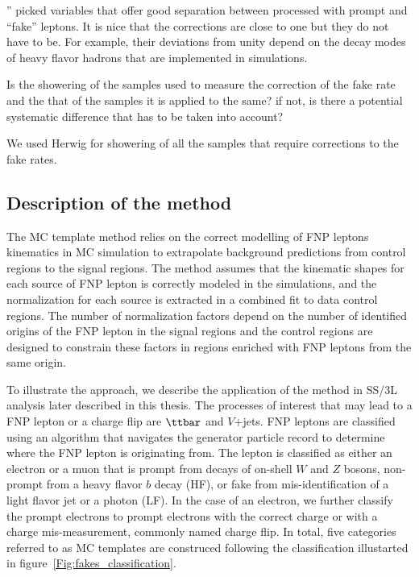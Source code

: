 ''
picked variables that offer good separation between processed with prompt and ``fake'' leptons.
It is nice that the corrections are close to one but they do not have to be. For example, their deviations from unity depend on the decay modes of heavy flavor hadrons that are implemented in simulations.

Is the showering of the samples used to measure the correction of the fake rate and the that of the samples it is applied to the same? if not, is there a potential systematic difference that has to be taken into account?

We used Herwig for showering of all the samples that require corrections to the fake rates.


\subsection{Description of the method}

The MC template method relies on the correct modelling of FNP leptons kinematics in 
MC simulation to extrapolate background predictions from control regions to the signal regions.
The method assumes that the kinematic shapes for each source of FNP lepton is correctly modeled in the simulations, 
and the normalization for each source is extracted in a combined fit to data control regions.
The number of normalization factors depend on the number of identified origins of the FNP lepton in the signal regions
and the control regions are designed to constrain these factors in regions enriched with FNP leptons from the same origin.

To illustrate the approach, we describe the application of the method in SS/3L analysis later described in this thesis.
The processes of interest that may lead to a FNP lepton or a charge flip are $\ttbar$ and $V$+jets. 
FNP leptons are classified using an algorithm that navigates the generator particle record to determine where the FNP lepton 
is originating from. 
The lepton is classified as either an electron or a muon that is prompt from decays of on-shell $W$ and $Z$ bosons, 
non-prompt from a heavy flavor $b$ decay (HF), or fake from mis-identification of a light flavor jet or a photon (LF). 
In the case of an electron, we further classify the prompt electrons to prompt electrons with the correct charge or with a 
charge mis-measurement, commonly named charge flip.
In total, five categories referred to as MC templates are construced following the classification illustarted 
in figure~\ref{Fig:fakes_classification}.

